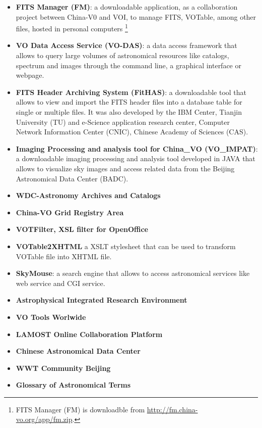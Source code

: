 \begin{itemize}
\item \textbf{FITS Manager (FM)}:
a downloadable application, as a collaboration project between China-V0 and VOI,
to manage FITS, VOTable, among other files, hosted in personal computers
\footnote{FITS Manager (FM) is downloadble from
\url{http://fm.china-vo.org/app/fm.zip}.} 

\item \textbf{VO Data Access Service (VO-DAS)}:
a data access framework that allows to query large volumes of astronomical
resources like catalogs, spectrum and images through the command line, a
graphical interface or webpage.

\item \textbf{FITS Header Archiving System (FitHAS)}:
a downloadable tool that allows to view and import the FITS header files into a
database table for single or multiple files. It was also developed by the IBM
Center, Tianjin University (TU) and e-Science application research center,
Computer Network Information Center (CNIC), Chinese Academy of Sciences (CAS).

\item \textbf{Imaging Processing and analysis tool for China\_VO (VO\_IMPAT)}:
a downloadable imaging processing and analysis tool developed in JAVA that
allows to visualize sky images and access related data from the Beijing
Astronomical Data Center (BADC). 

\item \textbf{WDC-Astronomy Archives and Catalogs}

\item \textbf{China-VO Grid Registry Area}

\item \textbf{VOTFilter, XSL filter for OpenOffice}

\item \textbf{VOTable2XHTML}
a XSLT stylesheet that can be used to transform VOTable file into XHTML file.

\item \textbf{SkyMouse}:
a search engine that allows to access astronomical services like web service and
CGI service.

\item \textbf{Astrophysical Integrated Research Environment}

\item \textbf{VO Tools Worlwide}

\item \textbf{LAMOST Online Collaboration Platform}

\item \textbf{Chinese Astronomical Data Center}

\item \textbf{WWT Community Beijing}

\item \textbf{Glossary of Astronomical Terms}
\end{itemize}

